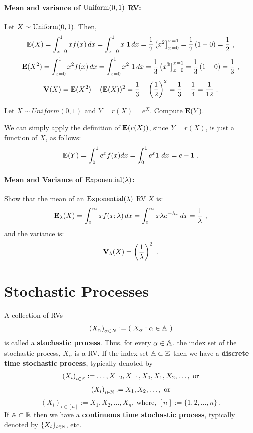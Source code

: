 \paragraph{Mean and variance of $\mbox{{\rm Uniform}}(0,1)$ RV:}
Let $X \sim \mbox{{\rm Uniform}}(0,1)$.  Then, 
\[
\mathbf{E}(X) = \int_{x=0}^1 x f(x)\, dx = \int_{x=0}^1 x \ 1 \, dx = \frac{1}{2} \left( x^2 \right]_{x=0}^{x=1} = \frac{1}{2} \left( 1-0 \right) = \frac{1}{2} \ ,
\]
\[
\mathbf{E}(X^2) = \int_{x=0}^1 x^2 f(x)\, dx = \int_{x=0}^1 x^2 \ 1 \, dx =  \frac{1}{3} \left( x^3 \right]_{x=0}^{x=1} = \frac{1}{3} \left( 1-0 \right) = \frac{1}{3} \ ,
\]
\[
\mathbf{V}(X) = \mathbf{E}(X^2) - (\mathbf{E}(X))^2 = \frac{1}{3}  - \left( \frac{1}{2} \right)^2  = \frac{1}{3}  - \frac{1}{4} = \frac{1}{12} \ .
\]

\begin{example}
Let $X \sim Uniform(0,1)$ and $Y=r(X)=e^X$.  Compute $\mathbf{E}(Y)$. 

We can simply apply the definition of $\mathbf{E}(r(X))$, since $Y=r(X)$, is just a function of $X$, as follows: 
\[
\mathbf{E}(Y) = \int_0^1 e^x f(x) dx = \int_0^1 e^x 1 \ dx = e-1 \ .
\]
\end{example}

\paragraph{Mean and Variance of $\mbox{{\rm Exponential}}(\lambda)$:}
Show that the mean of an $\mbox{{\rm Exponential}}(\lambda)$ RV $X$ is:
\[
\mathbf{E}_{\lambda}(X) = \int_{0}^{\infty} x f(x;\lambda)\,dx
=   \int_{0}^{\infty} x \lambda e^{-\lambda x}\,dx
= \frac{1}{\lambda} \ ,
\]
and the variance is:
\[
\mathbf{V}_{\lambda}(X) = \left(  \frac{1}{\lambda} \right)^2 \ .
\]


\section{Stochastic Processes}\label{S:StochProc}

\begin{definition}
A collection of RVs  \[
\left(X_{\alpha} \right)_{\alpha \in N} := \left( \  X_{\alpha} : \alpha \in \mathbb{A} \  \right)
\]
is called a {\bf stochastic process}.  Thus, for every $\alpha \in  \mathbb{A}$, the index set of the stochastic process, $X_{\alpha}$ is a RV.  If the index set $ \mathbb{A}  \subset \mathbb{Z}$ then we have  a {\bf discrete time stochastic process}, typically denoted by 
\[
\left(X_i\right)_{i \in \mathbb{Z}} := \ldots, X_{-2},X_{-1},X_0, X_1,X_2,\ldots , \  \text{or}
\]
\[
\left( X_i \right)_{i \in \mathbb{N}} := X_1,X_2,\ldots , \  \text{or}
\]
\[
\left( X_i \right)_{i \in [n]} := X_1,X_2,\ldots , X_n , \ \text{where, } [n]:= \{1,2,\ldots,n\} \ .
\]
If $\mathbb{A} \subset \mathbb{R}$ then we have a {\bf continuous time stochastic process}, typically denoted by $\{X_t\}_{t \in \mathbb{R}}$, etc.  
\end{definition}

